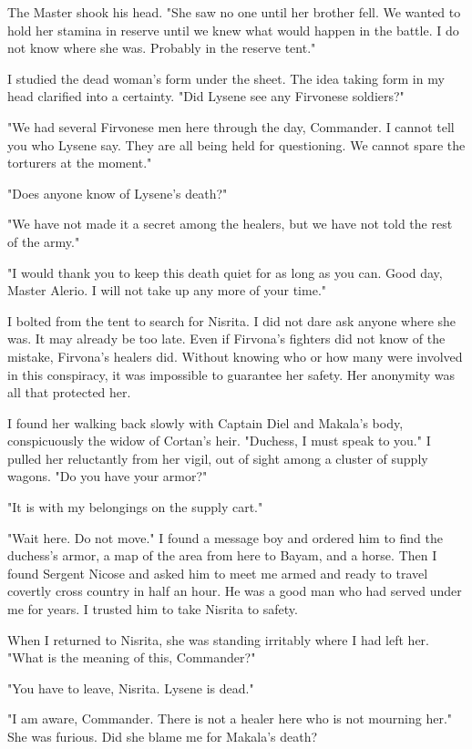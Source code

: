 \documentclass{article}
\begin{document}
The Master shook his head. "She saw no one until her brother fell. We wanted to hold her stamina in reserve until we knew what would happen in the battle. I do not know where she was. Probably in the reserve tent."

I studied the dead woman's form under the sheet. The idea taking form in my head clarified into a certainty. "Did Lysene see any Firvonese soldiers?"

"We had several Firvonese men here through the day, Commander. I cannot tell you who Lysene say. They are all being held for questioning. We cannot spare the torturers at the moment."

"Does anyone know of Lysene's death?"

"We have not made it a secret among the healers, but we have not told the rest of the army."

"I would thank you to keep this death quiet for as long as you can. Good day, Master Alerio. I will not take up any more of your time."

I bolted from the tent to search for Nisrita. I did not dare ask anyone where she was. It may already be too late. Even if Firvona's fighters did not know of the mistake, Firvona's healers did. Without knowing who or how many were involved in this conspiracy, it was impossible to guarantee her safety. Her anonymity was all that protected her.

I found her walking back slowly with Captain Diel and Makala's body, conspicuously the widow of Cortan's heir. "Duchess, I must speak to you." I pulled her reluctantly from her vigil, out of sight among a cluster of supply wagons. "Do you have your armor?"

"It is with my belongings on the supply cart."

"Wait here. Do not move." I found a message boy and ordered him to find the duchess's armor, a map of the area from here to Bayam, and a horse. Then I found Sergent Nicose and asked him to meet me armed and ready to travel covertly cross country in half an hour. He was a good man who had served under me for years. I trusted him to take Nisrita to safety.

When I returned to Nisrita, she was standing irritably where I had left her. "What is the meaning of this, Commander?"

"You have to leave, Nisrita. Lysene is dead."

"I am aware, Commander. There is not a healer here who is not mourning her." She was furious. Did she blame me for Makala's death? 
\end{document}
